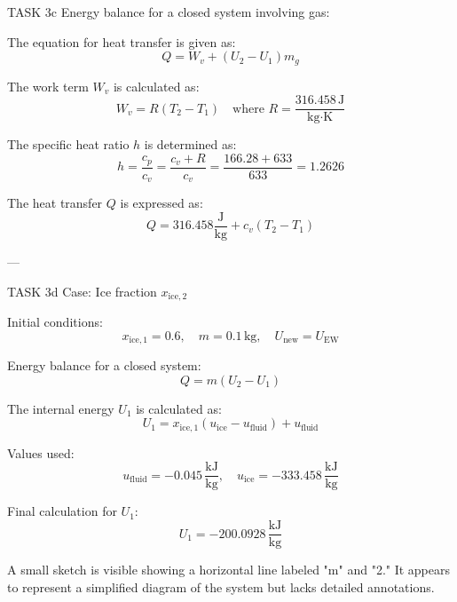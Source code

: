 TASK 3c  
Energy balance for a closed system involving gas:  

The equation for heat transfer is given as:  
\[
Q = W_v + (U_2 - U_1) m_g
\]  

The work term \( W_v \) is calculated as:  
\[
W_v = R (T_2 - T_1) \quad \text{where } R = \frac{316.458 \, \text{J}}{\text{kg·K}}
\]  

The specific heat ratio \( h \) is determined as:  
\[
h = \frac{c_p}{c_v} = \frac{c_v + R}{c_v} = \frac{166.28 + 633}{633} = 1.2626
\]  

The heat transfer \( Q \) is expressed as:  
\[
Q = 316.458 \frac{\text{J}}{\text{kg}} + c_v (T_2 - T_1)
\]  

---

TASK 3d  
Case: Ice fraction \( x_{\text{ice},2} \)  

Initial conditions:  
\[
x_{\text{ice},1} = 0.6, \quad m = 0.1 \, \text{kg}, \quad U_{\text{new}} = U_{\text{EW}}
\]  

Energy balance for a closed system:  
\[
Q = m (U_2 - U_1)
\]  

The internal energy \( U_1 \) is calculated as:  
\[
U_1 = x_{\text{ice},1} (u_{\text{ice}} - u_{\text{fluid}}) + u_{\text{fluid}}
\]  

Values used:  
\[
u_{\text{fluid}} = -0.045 \, \frac{\text{kJ}}{\text{kg}}, \quad u_{\text{ice}} = -333.458 \, \frac{\text{kJ}}{\text{kg}}
\]  

Final calculation for \( U_1 \):  
\[
U_1 = -200.0928 \, \frac{\text{kJ}}{\text{kg}}
\]  

A small sketch is visible showing a horizontal line labeled "m" and "2." It appears to represent a simplified diagram of the system but lacks detailed annotations.